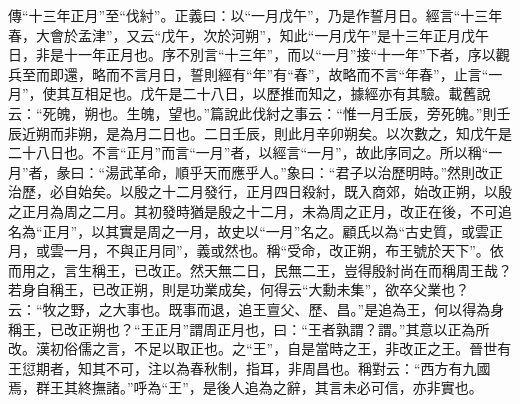 {\noindent\zhuan{}\fzbyks 傳“十三年正月”至“伐紂”。正義曰：以“一月戊午”，乃是作誓月日。經言“十三年春，大會於孟津”，又云“戊午，次於河朔”，知此“一月戊午”是十三年正月戊午日，非是十一年正月也。序不別言“十三年”，而以“一月”接“十一年”下者，序以觀兵至而即還，略而不言月日，誓則經有“年”有“春”，故略而不言“年春”，止言“一月”，使其互相足也。戊午是二十八日，以歷推而知之，據經亦有其驗。載舊說云：“死魄，朔也。生魄，望也。”篇說此伐紂之事云：“惟一月壬辰，旁死魄。”則壬辰近朔而非朔，是為月二日也。二日壬辰，則此月辛卯朔矣。以次數之，知戊午是二十八日也。不言“正月”而言“一月”者，以經言“一月”，故此序同之。所以稱“一月”者，彖曰：“湯武革命，順乎天而應乎人。”象曰：“君子以治歷明時。”然則改正治歷，必自始矣。以殷之十二月發行，正月四日殺紂，既入商郊，始改正朔，以殷之正月為周之二月。其初發時猶是殷之十二月，未為周之正月，改正在後，不可追名為“正月”，以其實是周之一月，故史以“一月”名之。顧氏以為“古史質，或雲正月，或雲一月，不與正月同”，義或然也。稱“受命，改正朔，布王號於天下”。依而用之，言生稱王，已改正。然天無二日，民無二王，豈得殷紂尚在而稱周王哉？若身自稱王，已改正朔，則是功業成矣，何得云“大勳未集”，欲卒父業也？云：“牧之野，之大事也。既事而退，追王亶父、歷、昌。”是追為王，何以得為身稱王，已改正朔也？“王正月”謂周正月也，曰：“王者孰謂？謂。”其意以正為所改。漢初俗儒之言，不足以取正也。之“王”，自是當時之王，非改正之王。晉世有王愆期者，知其不可，注以為春秋制，指耳，非周昌也。稱對云：“西方有九國焉，群王其終撫諸。”呼為“王”，是後人追為之辭，其言未必可信，亦非實也。 \par}

